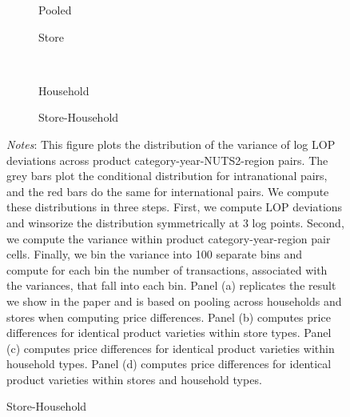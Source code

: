  \begin{figure}[H]
    \centering
    \caption{Variance of LOP deviations - Transaction weighted}
    \label{fig: app_redform_sd_w}
    \begin{subfigure}[t]{.49\textwidth}
         \centering
         \caption{Pooled}
         \scalebox{0.45}{}
     \end{subfigure}
     \begin{subfigure}[t]{.49\textwidth}
         \centering
         \caption{Store}
         \scalebox{0.45}{}
     \end{subfigure}\\
     \begin{subfigure}[t]{.49\textwidth}
         \centering
         \caption{Household}
         \scalebox{0.45}{}
     \end{subfigure}
     \begin{subfigure}[t]{.49\textwidth}
         \centering
         \caption{Store-Household}
         \scalebox{0.45}{}
     \end{subfigure}
     \parbox{\textwidth}{
        \begin{spacing}{1} 
            {\footnotesize 
            \textit{Notes}: This figure plots the distribution of the variance of log LOP deviations across product category-year-NUTS2-region pairs. The grey bars plot the conditional distribution for intranational pairs, and the red bars do the same for international pairs. We compute these distributions in three steps. First, we compute LOP deviations and winsorize the distribution symmetrically at 3 log points. Second, we compute the variance within product category-year-region pair cells. Finally, we bin the variance into 100 separate bins and compute for each bin the number of transactions, associated with the variances, that fall into each bin. Panel (a) replicates the result we show in the paper and is based on pooling across households and stores when computing price differences. Panel (b) computes price differences for identical product varieties within store types. Panel (c) computes price differences for identical product varieties within household types. Panel (d) computes price differences for identical product varieties within stores and household types.}
        \end{spacing}}
 \end{figure} 

